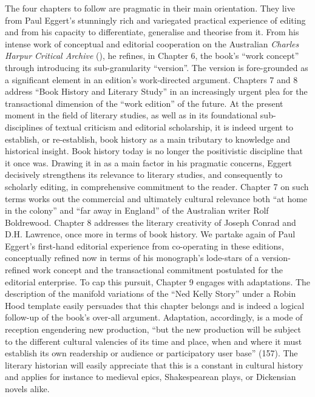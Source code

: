 \begin{review}
The four chapters to follow are pragmatic in their main orientation.
They live from Paul Eggert's stunningly rich and variegated practical
experience of editing and from his capacity to differentiate, generalise
and theorise from it. From his intense work of conceptual and editorial
cooperation on the Australian \emph{Charles Harpur Critical Archive} (\citeyear{harpur_charles_2019}), he
refines, in Chapter 6, the book's ``work concept'' through introducing
its sub-granularity ``version''. The version is fore-grounded as a
significant element in an edition's work-directed argument. Chapters 7
and 8 address ``Book History and Literary Study'' in an increasingly
urgent plea for the transactional dimension of the ``work edition'' of
the future. At the present moment in the field of literary studies, as
well as in its foundational sub-disciplines of textual criticism and
editorial scholarship, it is indeed urgent to establish, or
re-establish, book history as a main tributary to knowledge and
historical insight. Book history today is no longer the positivistic
discipline that it once was. Drawing it in as a main factor in his
pragmatic concerns, Eggert decisively strengthens its relevance to
literary studies, and consequently to scholarly editing, in
comprehensive commitment to the reader. Chapter 7 on such terms works
out the commercial and ultimately cultural relevance both ``at home in
the colony'' and ``far away in England'' of the Australian writer Rolf
Boldrewood. Chapter 8 addresses the literary creativity of Joseph Conrad
and D.H. Lawrence, once more in terms of book history. We partake again
of Paul Eggert's first-hand editorial experience from co-operating in
these editions, conceptually refined now in terms of his monograph's
lode-stars of a version-refined work concept and the transactional
commitment postulated for the editorial enterprise. To cap this pursuit,
Chapter 9 engages with adaptations. The description of the manifold
variations of the ``Ned Kelly Story'' under a Robin Hood template easily
persuades that this chapter belongs and is indeed a logical follow-up of
the book's over-all argument. Adaptation, accordingly, is a mode of
reception engendering new production, ``but the new production will be
subject to the different cultural valencies of its time and place, when
and where it must establish its own readership or audience or
participatory user base'' (157). The literary historian will easily
appreciate that this is a constant in cultural history and applies for
instance to medieval epics, Shakespearean plays, or Dickensian novels
alike.


\end{review}
